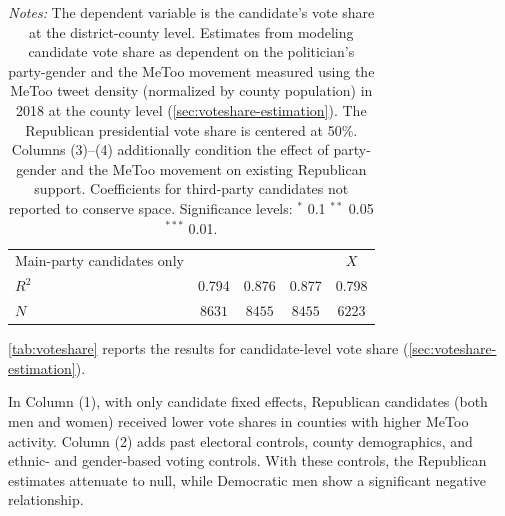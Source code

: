 \documentclass[manuscript,screen,nonacm,11pt,acm]{acmart}
\begin{document}
\begin{table}[tbp]
\begin{adjustbox}{max width=1\textwidth}
\begin{tabular}{@{\hspace{0\tabcolsep}}l*{4}{D{.}{.}{-1}}@{\hspace{0\tabcolsep}}}
Main-party candidates only&                  &                  &                  &         \\
$ R^2 $   &    0.794         &    0.876         &    0.877         &    0.798         \\
$ N $     &         &         &         &         \\
			\bottomrule
		\end{tabular}
	\end{adjustbox}
	\caption*{
		\footnotesize
		\emph{Notes:}
		The dependent variable is the candidate's vote share at the district-county level.
		Estimates from modeling candidate vote share as dependent on the politician's party-gender and the MeToo movement measured using the MeToo tweet density (normalized by county population) in 2018 at the county level (\cref{sec:voteshare-estimation}).
		The Republican presidential vote share is centered at 50\%.
		Columns (3)--(4) additionally condition the effect of party-gender and the MeToo movement on existing Republican support.
		Coefficients for third-party candidates not reported to conserve space.
		Significance levels: $^*$ 0.1 $^{**}$ 0.05 $^{***}$ 0.01.
	}
\end{table}

\cref{tab:voteshare} reports the results for candidate-level vote share (\cref{sec:voteshare-estimation}).

In Column (1), with only candidate fixed effects, Republican candidates (both men and women) received lower vote shares in counties with higher MeToo activity.
Column (2) adds past electoral controls, county demographics, and ethnic- and gender-based voting controls.
With these controls, the Republican estimates attenuate to null, while Democratic men show a significant negative relationship.
\end{document}
